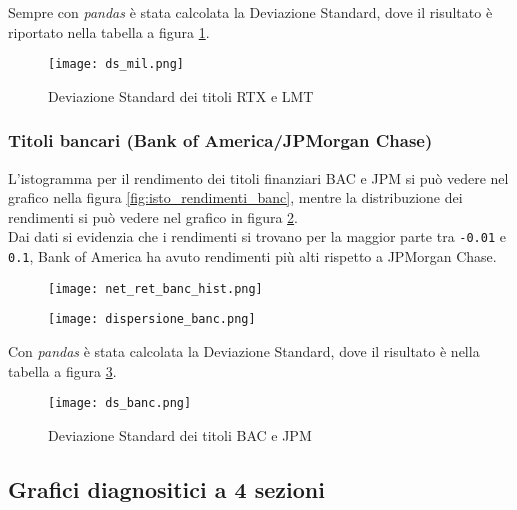 Sempre con \emph{pandas} è stata calcolata la Deviazione Standard, dove il risultato è riportato nella tabella a figura \ref{fig:ds_mil}.

\begin{figure}[h]
  \centering
  \texttt{[image: ds\_mil.png]}
  \caption{Deviazione Standard dei titoli RTX e LMT}
  \label{fig:ds_mil}
\end{figure}

\pagebreak

\subsubsection{Titoli bancari (Bank of America/JPMorgan Chase)}

L'istogramma per il rendimento dei titoli finanziari BAC e JPM si può vedere nel grafico nella figura \ref{fig:isto_rendimenti_banc}, mentre la distribuzione dei rendimenti
si può vedere nel grafico in figura \ref{fig:dispersione_banc}.\\
Dai dati si evidenzia che i rendimenti si trovano per la maggior parte tra \verb|-0.01| e \verb|0.1|, Bank of America ha avuto rendimenti più alti
rispetto a JPMorgan Chase.

\begin{figure}[h]
  \centering
  \begin{minipage}{.5\textwidth}
    \centering
    \texttt{[image: net\_ret\_banc\_hist.png]}
    \label{fig:isto_rendimenti_banc}
  \end{minipage}%
  \begin{minipage}{.5\textwidth}
    \centering
    \texttt{[image: dispersione\_banc.png]}
    \label{fig:dispersione_banc}
  \end{minipage}
\end{figure}

Con \emph{pandas} è stata calcolata la Deviazione Standard, dove il risultato è nella tabella a figura \ref{fig:ds_banc}.

\begin{figure}[h]
  \centering
  \texttt{[image: ds\_banc.png]}
  \caption{Deviazione Standard dei titoli BAC e JPM}
  \label{fig:ds_banc}
\end{figure}

\pagebreak

\subsection{Grafici diagnositici a 4 sezioni}

